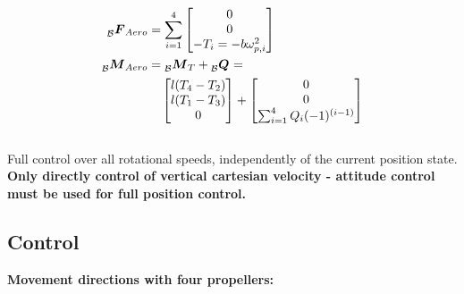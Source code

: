 \documentclass[a4paper, 8pt]{extarticle}
\newcommand{\mvec}[3]{  \prescript{}{\mathcal{#1}}{\bm{#2}}  _{#3} }
\begin{document}
\begin{multicols*}{3}
\begin{align*}
\mvec{B}{F}{Aero} &= \sum_{i=1}^4 \begin{bmatrix}
0 \\ 0 \\ -T_i = -b{\bf \omega}_{p,i}^2
\end{bmatrix}\\
\mvec{B}{M}{Aero} &= \mvec{B}{M}{T} + \mvec{B}{Q}{} =\\ \quad & \quad  \begin{bmatrix}
l(T_4 - T_2) \\
l(T_1 - T_3) \\
0
\end{bmatrix} + \begin{bmatrix}
0 \\ 0 \\ \sum_{i=1}^4 Q_i(-1)^{(i-1)}
\end{bmatrix}
\end{align*}\\

Full control over all rotational speeds, independently of the current position state. \textbf{Only directly control of vertical cartesian velocity - attitude control must be used for full position control.}

\subsection{Control}

\textbf{Movement directions with four propellers:}

\begin{center}
    

\end{center}
\end{multicols*}
\end{document}
